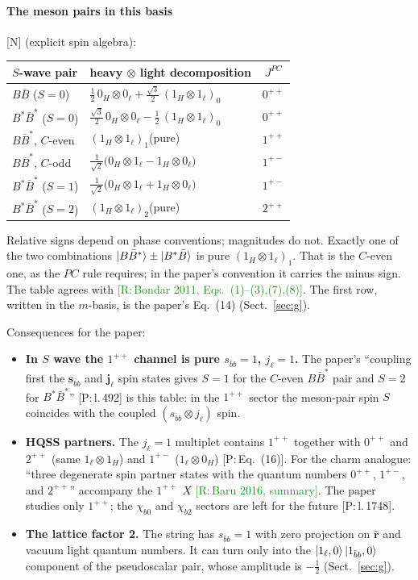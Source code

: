 \documentclass[11pt,a4paper]{article}
\newcommand{\tagP}[1]{\textcolor{blue!65!black}{\textsf{\small[P:\,#1]}}}
\newcommand{\tagR}[1]{\textcolor{ForestGreen}{\textsf{\small[R:\,#1]}}}
\newcommand{\tagN}{\textcolor{red!70!black}{\textsf{\small[N]}}}
\begin{document}
\paragraph{The meson pairs in this basis} \tagN{} (explicit spin algebra):
\begin{center}
\small
\begin{tabular}{llc}
\toprule
$S$-wave pair & heavy $\otimes$ light decomposition & $J^{PC}$\\
\midrule
$B\bar B$ ($S=0$) & $\frac12\,0_H\otimes0_\ell+\frac{\sqrt3}{2}\,(1_H\otimes1_\ell)_0$ & $0^{++}$\\
$B^*\bar B^*$ ($S=0$) & $\frac{\sqrt3}{2}\,0_H\otimes0_\ell-\frac12\,(1_H\otimes1_\ell)_0$ & $0^{++}$\\
$B\bar B^*$, $C$-even & $(1_H\otimes1_\ell)_1$\quad (pure) & $1^{++}$\\
$B\bar B^*$, $C$-odd & $\frac{1}{\sqrt2}\big(0_H\otimes1_\ell-1_H\otimes0_\ell\big)$ & $1^{+-}$\\
$B^*\bar B^*$ ($S=1$) & $\frac{1}{\sqrt2}\big(0_H\otimes1_\ell+1_H\otimes0_\ell\big)$ & $1^{+-}$\\
$B^*\bar B^*$ ($S=2$) & $(1_H\otimes1_\ell)_2$\quad (pure) & $2^{++}$\\
\bottomrule
\end{tabular}
\end{center}
Relative signs depend on phase conventions; magnitudes do not. Exactly one of the two combinations $\ket{B\bar B^*}\pm\ket{B^*\bar B}$ is pure $(1_H\otimes1_\ell)_1$. That is the $C$-even one, as the $PC$ rule requires; in the paper's convention it carries the minus sign. The table agrees with \tagR{Bondar 2011, Eqs.~(1)--(3),(7),(8)}. The first row, written in the $m$-basis, is the paper's Eq.~(14) (Sect.~\ref{sec:g}).

Consequences for the paper:
\begin{itemize}
\item \textbf{In $S$ wave the $1^{++}$ channel is pure $s_{\bar bb}=1$, $j_\ell=1$.} The paper's ``coupling first the $\bm s_{\bar bb}$ and $\bm j_\ell$ spin states gives $S=1$ for the $C$-even $B\bar B^*$ pair and $S=2$ for $B^*\bar B^*$'' \tagP{l.\,492} is this table: in the $1^{++}$ sector the meson-pair spin $S$ coincides with the coupled $(s_{\bar bb}\otimes j_\ell)$ spin.
\item \textbf{HQSS partners.} The $j_\ell=1$ multiplet contains $1^{++}$ together with $0^{++}$ and $2^{++}$ (same $1_\ell\otimes1_H$) and $1^{+-}$ ($1_\ell\otimes0_H$) \tagP{Eq.~(16)}. For the charm analogue: ``three degenerate spin partner states with the quantum numbers $0^{++}$, $1^{+-}$, and $2^{++}$'' accompany the $1^{++}$ $X$ \tagR{Baru 2016, summary}. The paper studies only $1^{++}$; the $\chi_{b0}$ and $\chi_{b2}$ sectors are left for the future \tagP{l.\,1748}.
\item \textbf{The lattice factor 2.} The string has $s_{\bar bb}=1$ with zero projection on $\hat{\bm r}$ and vacuum light quantum numbers. It can turn only into the $\ket{1_\ell,0}\ket{1_{\bar bb},0}$ component of the pseudoscalar pair, whose amplitude is $-\frac12$ (Sect.~\ref{sec:g}).
\end{itemize}
\end{document}
